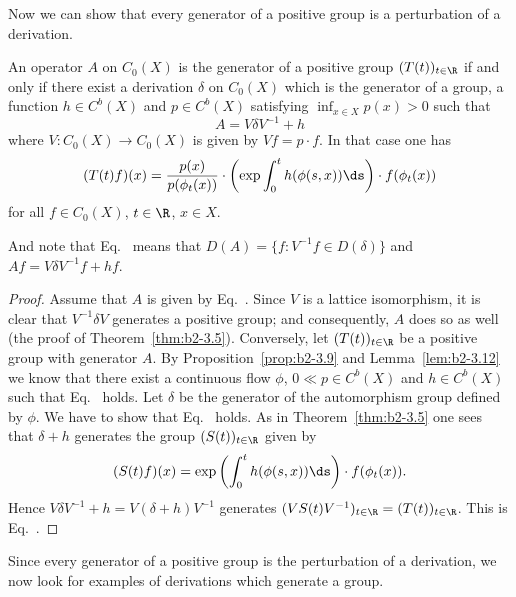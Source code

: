 Now we can show that every generator of a positive group is a perturbation of a derivation.
\begin{theorem}\label{thm:b2-3.14}
An operator $A$ on $C_{0}(X)$ is the generator of a positive group $(T(t))_{t \in \R}$ if and only if there exist a derivation $\delta$ on $C_{0}(X)$ which is the generator of a group, a function $h \in C^{b}(X)$ and $p \in C^{b}(X)$ satisfying $\inf_{x \in X} p(x) > 0$ such that
\begin{equation}\label{eq:b2-3.18}
A = V\delta V^{-1} + h
\end{equation}
where $V \colon C_{0}(X) \to C_{0}(X)$ is given by $Vf = p \cdot f$. In that case one has
\begin{equation}\label{eq:b2-3.19}
(T(t)f)(x) = \frac{p(x)}{p(\phi_{t}(x))} \cdot \left(\exp \int_{0}^{t} h(\phi(s,x)) \ds\right) \cdot f(\phi_{t}(x))
\end{equation}
for all $f \in C_{0}(X)$, $t \in \R$, $x \in X$.
\end{theorem}
And note that  Eq.~ means that $D(A) = \{ f \colon V^{-1}f \in D(\delta) \}$ and $Af = V\delta V^{-1}f + hf$.
\begin{proof}
Assume that $A$ is given by Eq.~.
Since $V$ is a lattice isomorphism, it is clear that $V^{-1}\delta V$ generates a positive group; and consequently, $A$ does so as well (\cf the proof of Theorem~\ref{thm:b2-3.5}).
Conversely, let $(T(t))_{t \in \R}$ be a positive group with generator $A$.
By Proposition~\ref{prop:b2-3.9} and Lemma~\ref{lem:b2-3.12} we know that there exist a continuous flow $\phi$, $0 \ll p \in C^{b}(X)$ and $h \in C^{b}(X)$ such that Eq.~ holds.
Let $\delta$ be the generator of the automorphism group defined by $\phi$.
We have to show that Eq.~ holds.
As in Theorem~\ref{thm:b2-3.5} one sees that $\delta + h$ generates the group $(S(t))_{t \in \R}$ given by 
\[
(S(t)f)(x) = \exp\left(\int_{0}^{t} h(\phi(s,x)) \ds \right) \cdot f(\phi_{t}(x)).
\]
Hence $V\delta V^{-1} + h = V(\delta + h)V^{-1}$ generates $(VS(t)V^{-1})_{t \in \R} = (T(t))_{t \in \R}$.
This is Eq.~.
\end{proof}
Since every generator of a positive group is the perturbation of a derivation, we now look for examples of derivations which generate a group.
